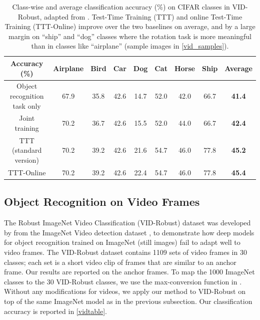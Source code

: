 \documentclass{article}
\theoremstyle{plain}
\theoremstyle{remark}
\theoremstyle{definition}
\begin{document}
\begin{table}[t!]
\begin{center}
{
\setlength\tabcolsep{4pt}
\begin{tabular}{c|ccccccc|c}
\toprule
Accuracy (\%)
		&Airplane	&Bird	&Car &Dog &Cat &Horse	&Ship  	&\textbf{Average}\\
\midrule
{\small Object recognition task only} & 67.9 & 35.8 & 42.6 & 14.7 & 52.0 & 42.0 & 66.7
&\textbf{41.4}\\
\midrule
{\small Joint training {\scriptsize \citep{hendrycks2019using}}} & 70.2 & 36.7 & 42.6 & 15.5 & 52.0 & 44.0 & 66.7
&\textbf{42.4}\\
\midrule
TTT (standard version) & 70.2 & 39.2 & 42.6 & 21.6 & 54.7 & 46.0 & 77.8
&\textbf{45.2}\\
\midrule 
TTT-Online & 70.2 & 39.2 & 42.6 & 22.4 & 54.7 & 46.0 & 77.8
&\textbf{45.4}\\
\bottomrule
\end{tabular}
}
\end{center}
\caption{
Class-wise and average classification accuracy (\%) on CIFAR classes in VID-Robust, adapted from \cite{shankar2019systematic}. Test-Time Training (TTT) and online Test-Time Training (TTT-Online) improve over the two baselines on average, and by a large margin on ``ship'' and ``dog'' classes where the rotation task is more meaningful than in classes like ``airplane'' (sample images in \autoref{vid_samples}). 
}
\label{table.cifar7}
\vspace{-1ex}
\end{table} 

\subsection{Object Recognition on Video Frames}
\label{ivc}
The Robust ImageNet Video Classification (VID-Robust) dataset was developed by \citet{shankar2019systematic} from the ImageNet Video detection dataset \citep{ILSVRC15}, to demonstrate how deep models for object recognition trained on ImageNet (still images) fail to adapt well to video frames. The VID-Robust dataset contains 1109 sets of video frames in 30 classes; each set is a short video clip of frames that are similar to an anchor frame. Our results are reported on the anchor frames. To map the 1000 ImageNet classes to the 30 VID-Robust classes, we use the max-conversion function in \citet{shankar2019systematic}.
Without any modifications for videos, we apply our method to VID-Robust on top of the same ImageNet model as in the previous subsection. 
Our classification accuracy is reported in \autoref{vidtable}. 
\end{document}
